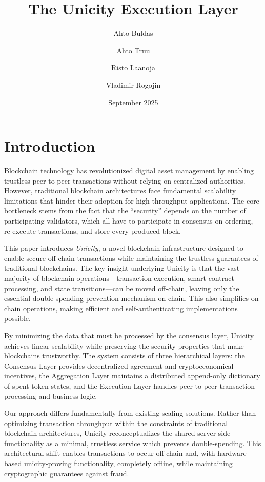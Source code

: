 \documentclass{article}
\title{ The Unicity Execution Layer }
\author{Ahto Buldas \and Ahto Truu \and Risto Laanoja \and Vladimir Rogojin}
\date{September 2025}
\begin{document}
\maketitle

\section{Introduction}

Blockchain technology has revolutionized digital asset management by enabling trustless peer-to-peer transactions without relying on centralized authorities. However, traditional blockchain architectures face fundamental scalability limitations that hinder their adoption for high-throughput applications. The core bottleneck stems from the fact that the ``security'' depends on the number of participating validators, which all have to participate in consensus on ordering, re-execute transactions, and store every produced block.

This paper introduces \emph{Unicity}, a novel blockchain infrastructure designed to enable secure off-chain transactions while maintaining the trustless guarantees of traditional blockchains. The key insight underlying Unicity is that the vast majority of blockchain operations—transaction execution, smart contract processing, and state transitions—can be moved off-chain, leaving only the essential double-spending prevention mechanism on-chain. This also simplifies on-chain operations, making efficient and self-authenticating implementations possible.

By minimizing the data that must be processed by the consensus layer, Unicity achieves linear scalability while preserving the security properties that make blockchains trustworthy. The system consists of three hierarchical layers: the Consensus Layer provides decentralized agreement and cryptoeconomical incentives, the Aggregation Layer maintains a distributed append-only dictionary of spent token states, and the Execution Layer handles peer-to-peer transaction processing and business logic.

Our approach differs fundamentally from existing scaling solutions. Rather than optimizing transaction throughput within the constraints of traditional blockchain architectures, Unicity reconceptualizes the shared server-side functionality as a minimal, trustless service which prevents double-spending. This architectural shift enables transactions to occur off-chain and, with hardware-based unicity-proving functionality, completely offline, while maintaining cryptographic guarantees against fraud.
\end{document}

